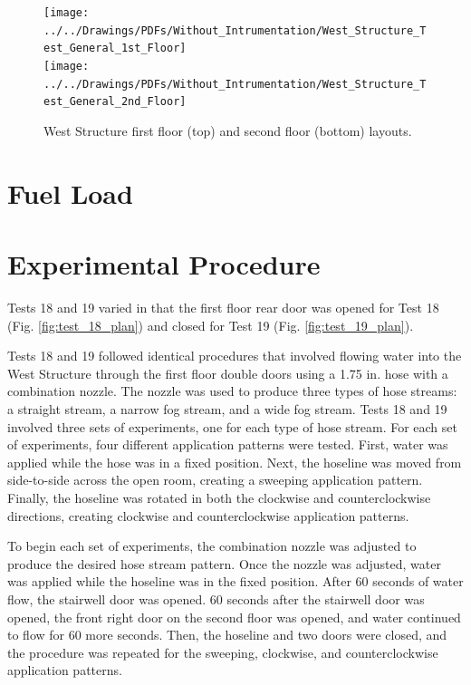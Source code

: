 \documentclass[12pt,oneside]{book}
\begin{document}
\clearpage

\begin{figure}[!ht]
\texttt{[image: ../../Drawings/PDFs/Without\_Intrumentation/West\_Structure\_Test\_General\_1st\_Floor]}
\\
\texttt{[image: ../../Drawings/PDFs/Without\_Intrumentation/West\_Structure\_Test\_General\_2nd\_Floor]}
\caption{West Structure first floor (top) and second floor (bottom) layouts.}
\label{fig:west_general_plan}
\end{figure}

\clearpage
\section{Fuel Load}

\section{Experimental Procedure}
Tests 18 and 19 varied in that the first floor rear door was opened for Test 18 (Fig. \ref{fig:test_18_plan}) and closed for Test 19 (Fig. \ref{fig:test_19_plan}).

Tests 18 and 19 followed identical procedures that involved flowing water into the West Structure through the first floor double doors using a 1.75 in. hose with a combination nozzle. The nozzle was used to produce three types of hose streams: a straight stream, a narrow fog stream, and a wide fog stream. Tests 18 and 19 involved three sets of experiments, one for each type of hose stream. For each set of experiments, four different application patterns were tested. First, water was applied while the hose was in a fixed position. Next, the hoseline was moved from side-to-side across the open room, creating a sweeping application pattern. Finally, the hoseline was rotated in both the clockwise and counterclockwise directions, creating clockwise and counterclockwise application patterns. 

To begin each set of experiments, the combination nozzle was adjusted to produce the desired hose stream pattern. Once the nozzle was adjusted, water was applied while the hoseline was in the fixed position. After 60 seconds of water flow, the stairwell door was opened. 60 seconds after the stairwell door was opened, the front right door on the second floor was opened, and water continued to flow for 60 more seconds. Then, the hoseline and two doors were closed, and the procedure was repeated for the sweeping, clockwise, and counterclockwise application patterns.
\end{document}
